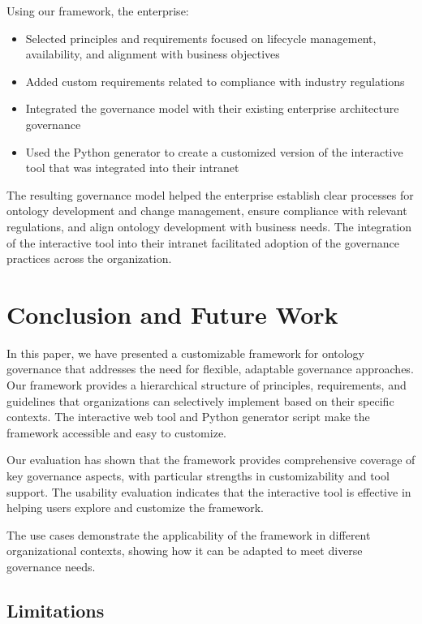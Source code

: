 \documentclass[conference]{IEEEtran}
\begin{document}
Using our framework, the enterprise:

\begin{itemize}
    \item Selected principles and requirements focused on lifecycle management, availability, and alignment with business objectives
    \item Added custom requirements related to compliance with industry regulations
    \item Integrated the governance model with their existing enterprise architecture governance
    \item Used the Python generator to create a customized version of the interactive tool that was integrated into their intranet
\end{itemize}

The resulting governance model helped the enterprise establish clear processes for ontology development and change management, ensure compliance with relevant regulations, and align ontology development with business needs. The integration of the interactive tool into their intranet facilitated adoption of the governance practices across the organization.

\section{Conclusion and Future Work}
\label{sec:conclusion}

In this paper, we have presented a customizable framework for ontology governance that addresses the need for flexible, adaptable governance approaches. Our framework provides a hierarchical structure of principles, requirements, and guidelines that organizations can selectively implement based on their specific contexts. The interactive web tool and Python generator script make the framework accessible and easy to customize.

Our evaluation has shown that the framework provides comprehensive coverage of key governance aspects, with particular strengths in customizability and tool support. The usability evaluation indicates that the interactive tool is effective in helping users explore and customize the framework.

The use cases demonstrate the applicability of the framework in different organizational contexts, showing how it can be adapted to meet diverse governance needs.

\subsection{Limitations}
\end{document}

